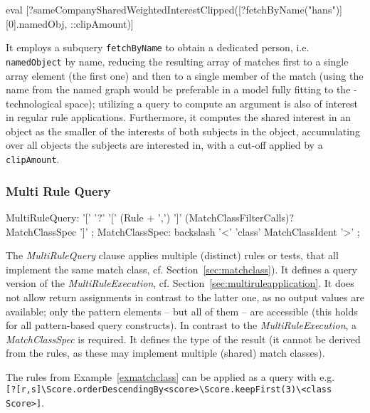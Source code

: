 \begin{example}
  \begin{grshell}
eval [?sameCompanySharedWeightedInterestClipped([?fetchByName("hans")][0].namedObj, ::clipAmount)]
  \end{grshell}
	
It employs a subquery \texttt{fetchByName} to obtain a dedicated person, i.e. \texttt{namedObject} by name, reducing the resulting array of matches first to a single array element (the first one) and then to a single member of the match (using the name from the named graph would be preferable in a model fully fitting to the \GrG-technological space); utilizing a query to compute an argument is also of interest in regular rule applications.
Furthermore, it computes the shared interest in an object as the smaller of the interests of both subjects in the object, accumulating over all objects the subjects are interested in, with a cut-off applied by a \texttt{clipAmount}.
\end{example}

\subsubsection*{Multi Rule Query}

\begin{rail}
  MultiRuleQuery: '[' '?' '[' (Rule + ',') ']' (MatchClassFilterCalls)? MatchClassSpec ']' ;
  MatchClassSpec: backslash '<' 'class' MatchClassIdent '>' ;
\end{rail}

The \emph{MultiRuleQuery} clause applies multiple (distinct) rules or tests, that all implement the same match class, cf. Section~\ref{sec:matchclass}).
It defines a query version of the \emph{MultiRuleExecution}, cf. Section~\ref{sec:multiruleapplication}.
It does not allow return assignments in contrast to the latter one, as no output values are available; only the pattern elements -- but all of them -- are accessible (this holds for all pattern-based query constructs).
In contrast to the \emph{MultiRuleExecution}, a \emph{MatchClassSpec} is required.
It defines the type of the result (it cannot be derived from the rules, as these may implement multiple (shared) match classes).

\begin{example}
The rules from Example~\ref{exmatchclass} can be applied as a query with e.g. \\
\verb#[?[r,s]\Score.orderDescendingBy<score>\Score.keepFirst(3)\<class Score>]#.
\end{example}


